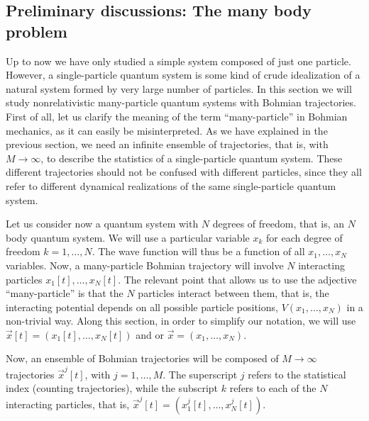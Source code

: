 \documentclass[onecolumn,nofootinbib, secnumarabic, amsmath, nobibnotes,12pt,aps,pra]{revtex4-1}
\begin{document}
\subsection{Preliminary discussions: The many body problem}\label{om.sec_many.1}

Up to now we have only studied a simple system composed of just one
particle. However, a single-particle quantum system is some kind of
crude idealization of a natural system formed by very large number
of particles. In this section we will study nonrelativistic
many-particle quantum systems with Bohmian trajectories. First of
all, let us clarify the meaning of the term ``many-particle'' in
Bohmian mechanics, as it can easily be misinterpreted. As we have
explained in the previous section, we need an infinite ensemble of
trajectories, that is, with $M\rightarrow\infty$, to describe the
statistics of a single-particle quantum system. These different
trajectories should not be confused with different particles, since
they all refer to different dynamical realizations of the same
single-particle quantum system.

Let us consider  now a quantum system with $N$ degrees of freedom,
that is, an $N$ body quantum system. We will use a particular
variable $x_k$ for each degree of freedom $k = 1,\ldots,N$. The wave
function will thus be a function of all $x_{1},\ldots,x_{N}$
variables. Now, a many-particle Bohmian trajectory will involve $N$
interacting particles $x_{1}[t],\ldots,x_{N}[t]$. The relevant point
that allows us to use the adjective ``many-particle'' is that the
$N$ particles interact between them, that is, the interacting
potential depends on all possible particle positions,
$V(x_{1},\ldots,x_{N})$ in a non-trivial way. Along this section, in order to simplify our
notation, we will use $\vec{x}[t] = (x_{1}[t],\ldots,x_{N}[t])$ and or
$\vec{x} = (x_{1},\ldots,x_{N})$.

Now, an ensemble of Bohmian trajectories  will be composed of $M\rightarrow\infty$
trajectories $\vec{x}^j[t]$, with $j = 1,\ldots,M$. The superscript
$j$ refers to the statistical index (counting trajectories), while
the subscript $k$ refers to each of the $N$ interacting particles,
that is, $\vec{x}^j[t] = (x^j_{1}[t],\ldots,x^j_{N}[t] )$.
\end{document}

